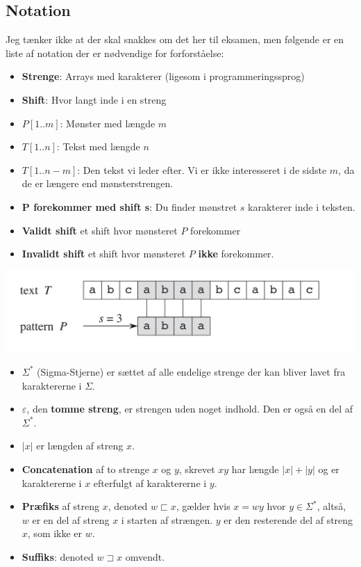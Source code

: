\documentclass[11pt]{article}
\theoremstyle{definition}
\theoremstyle{remark}
\begin{document}
\subsection{Notation}
\label{subsec:stringnotation}

Jeg tænker ikke at der skal snakkes om det her til eksamen, men følgende er en liste af notation der er nødvendige for  forforståelse:

\begin{itemize}
\item \textbf{Strenge}: Arrays med karakterer (ligesom i programmeringssprog)
\item \textbf{Shift}: Hvor langt inde i en streng
\item $P[1..m]$: Mønster med længde $m$
\item $T[1..n]$: Tekst med længde $n$
\item $T[1..n-m]$: Den tekst vi leder efter. Vi er ikke interesseret i de sidste $m$, da de er længere end mønsterstrengen.
\item \textbf{P forekommer med shift s}: Du finder mønstret $s$ karakterer inde i teksten.
\item \textbf{Validt shift} et shift hvor mønsteret $P$ forekommer
\item \textbf{Invalidt shift} et shift hvor mønsteret $P$ \textbf{ikke} forekommer. 
\end{itemize}
\includegraphics[width=400pt]{main--string-matching--notation-81a7.png}

\begin{itemize}
\item $\Sigma^{*}$ (Sigma-Stjerne) er sættet af alle endelige strenge der kan bliver lavet fra karaktererne i $\Sigma$. 
\item $\varepsilon$, den \textbf{tomme streng}, er strengen uden noget indhold. Den er også en del af $\Sigma^{*}$.
\item $|x|$ er længden af streng $x$. 
\item \textbf{Concatenation} af to strenge $x$ og $y$, skrevet $xy$ har længde $|x| + |y|$ og er karaktererne i $x$ efterfulgt af karaktererne i $y$.
\item \textbf{Præfiks} af streng $x$, denoted $w \sqsubset x$, gælder hvis $x = wy$ hvor $y \in \Sigma^{*}$, altså, $w$ er en del af streng $x$ i starten af strængen. $y$ er den resterende del af streng $x$, som ikke er $w$.
\item \textbf{Suffiks}: denoted $w \sqsupset x$ omvendt. 
\end{itemize}
\end{document}
